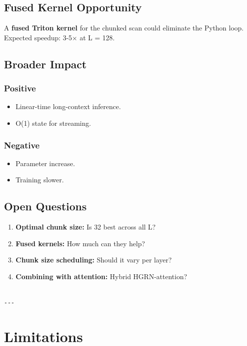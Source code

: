 \subsection{Fused Kernel Opportunity}

A \textbf{fused Triton kernel} for the chunked scan could eliminate the Python 
loop. Expected speedup: 3-5$\times$ at L = 128.

\subsection{Broader Impact}

\subsubsection{Positive}
\begin{itemize}
\item Linear-time long-context inference.
\item O(1) state for streaming.

\end{itemize}
\subsubsection{Negative}
\begin{itemize}
\item Parameter increase.
\item Training slower.

\end{itemize}
\subsection{Open Questions}

\begin{enumerate}
\item \textbf{Optimal chunk size:} Is 32 best across all L?
\item \textbf{Fused kernels:} How much can they help?
\item \textbf{Chunk size scheduling:} Should it vary per layer?
\item \textbf{Combining with attention:} Hybrid HGRN-attention?
\end{enumerate}
\begin{lstlisting}

---
\end{lstlisting}

\section{Limitations}

